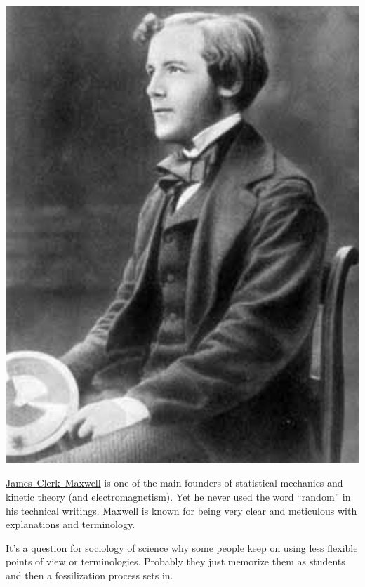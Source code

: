 \documentclass[
  a4paper,
  DIV=11,
  numbers=noendperiod,
  oneside]{scrreprt}
\begin{document}
\begin{marginfigure}

{\centering \includegraphics[width=1\textwidth,height=\textheight]{maxwell1.jpg}

}

\caption{\href{https://clerkmaxwellfoundation.org/html/about_maxwell.html}{James~Clerk~Maxwell}
is one of the main founders of statistical mechanics and kinetic theory
(and electromagnetism). Yet he never used the word ``random'' in his
technical writings. Maxwell is known for being very clear and meticulous
with explanations and terminology.}

\end{marginfigure}

It's a question for sociology of science why some people keep on using
less flexible points of view or terminologies. Probably they just
memorize them as students and then a fossilization process sets in.

\hfill\break
\end{document}
